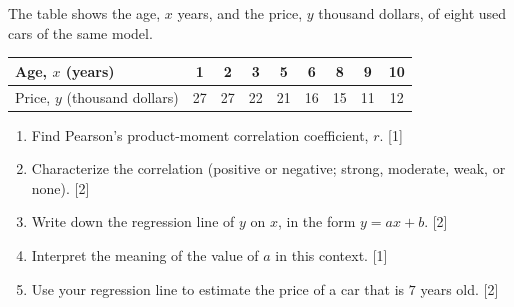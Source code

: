 \documentclass[12pt, twoside]{article}
\begin{document}
\begin{enumerate}[itemsep=0.15cm]
The table shows the age, $x$ years, and the price, $y$ thousand dollars,
of eight used cars of the same model.

\begin{center}
\setlength{\tabcolsep}{7pt}\renewcommand{\arraystretch}{1.2}
\begin{tabular}{|l|c|c|c|c|c|c|c|c|}
\hline
Age, $x$ (years) & 1 & 2 & 3 & 5 & 6 & 8 & 9 & 10 \\
\hline
Price, $y$ (thousand dollars) & 27 & 27 & 22 & 21 & 16 & 15 & 11 & 12 \\
\hline
\end{tabular}
\end{center}

\begin{enumerate}[itemsep=0.1cm]
  \item Find Pearson's product-moment correlation coefficient, $r$.
  \hfill [1]
  \item Characterize the correlation (positive or negative; strong,
  moderate, weak, or none). \hfill [2]
  \item Write down the regression line of $y$ on $x$, in the form
  $y = ax + b$. \hfill [2]
  \item Interpret the meaning of the value of $a$ in this context.
  \hfill [1]
  \item Use your regression line to estimate the price of a car that is
  $7$ years old. \hfill [2]
\end{enumerate}


\end{enumerate}
\end{document}

